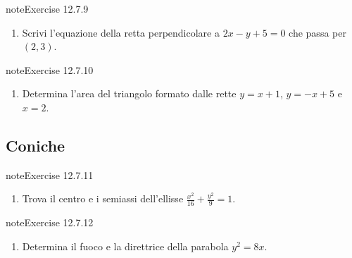 \documentclass[letterpaper,10pt,italian]{jupyterBook}
\begin{document}
\begin{sphinxadmonition}{note}{Exercise 12.7.9}


\begin{enumerate}
%
\setcounter{enumi}{8}
\item {} 
\sphinxAtStartPar
Scrivi l’equazione della retta perpendicolare a \( 2x - y + 5 = 0 \) che passa per \( (2, 3) \).

\end{enumerate}
\end{sphinxadmonition}
 \label{exercise:ch/analytic_geometry/analytic_geometry_2d/problems-exercise-9}

\begin{sphinxadmonition}{note}{Exercise 12.7.10}


\begin{enumerate}
%
\setcounter{enumi}{9}
\item {} 
\sphinxAtStartPar
Determina l’area del triangolo formato dalle rette \( y = x + 1 \), \( y = -x + 5 \) e \( x = 2 \).

\end{enumerate}
\end{sphinxadmonition}


\subsection{Coniche}
\label{\detokenize{ch/analytic_geometry/analytic_geometry_2d/problems:coniche}} \label{exercise:ch/analytic_geometry/analytic_geometry_2d/problems-exercise-10}

\begin{sphinxadmonition}{note}{Exercise 12.7.11}


\begin{enumerate}
%
\setcounter{enumi}{10}
\item {} 
\sphinxAtStartPar
Trova il centro e i semiassi dell’ellisse \( \frac{x^2}{16} + \frac{y^2}{9} = 1 \).

\end{enumerate}
\end{sphinxadmonition}
 \label{exercise:ch/analytic_geometry/analytic_geometry_2d/problems-exercise-11}

\begin{sphinxadmonition}{note}{Exercise 12.7.12}


\begin{enumerate}
%
\setcounter{enumi}{11}
\item {} 
\sphinxAtStartPar
Determina il fuoco e la direttrice della parabola \( y^2 = 8x \).

\end{enumerate}
\end{sphinxadmonition}
 \label{exercise:ch/analytic_geometry/analytic_geometry_2d/problems-exercise-12}
\end{document}
